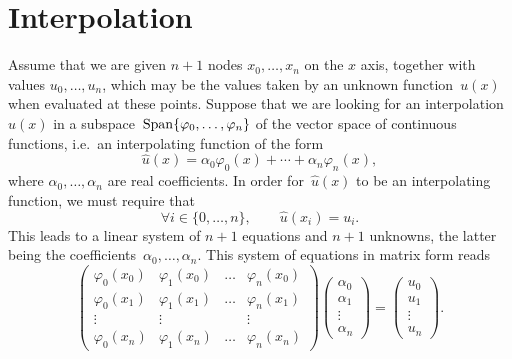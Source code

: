 \section{Interpolation}
Assume that we are given $n+1$ nodes $x_0, \dotsc, x_n$ on the $x$ axis,
together with values $u_0, \dotsc, u_n$,
which may be the values taken by an unknown function~$u(x)$ when evaluated at these points.
Suppose that we are looking for an interpolation~$\widehat u(x)$ in a subspace~$\operatorname{Span} \{\varphi_0, \dotsc, \varphi_n\}$
of the vector space of continuous functions, i.e.~an interpolating function of the form
\[
    \widehat u(x) = \alpha_0 \varphi_0(x) + \dotsb + \alpha_n \varphi_n(x),
\]
where $\alpha_0, \dotsc, \alpha_n$ are real coefficients.
In order for~$\widehat u(x)$ to be an interpolating function,
we must require that
\[
    \forall i \in \{0, \dotsc, n\}, \qquad
    \widehat u(x_i) = u_i.
\]
This leads to a linear system of $n+1$ equations and $n+1$ unknowns,
the latter being the coefficients~$\alpha_0, \dotsc, \alpha_n$.
This system of equations in matrix form reads
\begin{equation}
    \label{eq:linear_system_interpolation}
    \begin{pmatrix}
        \varphi_0(x_0) & \varphi_1(x_0) & \hdots & \varphi_n(x_0) \\
        \varphi_0(x_1) & \varphi_1(x_1) & \hdots & \varphi_n(x_1) \\
        \vdots & \vdots & & \vdots \\
        \varphi_0(x_n) & \varphi_1(x_n) & \hdots & \varphi_n(x_n)
    \end{pmatrix}
    \begin{pmatrix}
        \alpha_0 \\
        \alpha_1 \\
        \vdots \\
        \alpha_n
    \end{pmatrix}
    =
    \begin{pmatrix}
        u_0 \\
        u_1 \\
        \vdots \\
        u_n
    \end{pmatrix}.
\end{equation}

